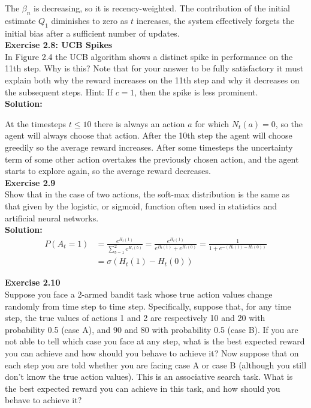 The $\beta_n$ is decreasing, so it is recency-weighted. The contribution of the initial estimate $Q_1$ diminishes to zero as $t$ increases, the system effectively forgets the initial bias after a sufficient number of updates.\\

\textbf{Exercise 2.8: UCB Spikes}\\
In Figure 2.4 the UCB algorithm shows a distinct spike
in performance on the 11th step. Why is this? Note that for your answer to be fully
satisfactory it must explain both why the reward increases on the 11th step and why it
decreases on the subsequent steps. Hint: If $c = 1$, then the spike is less prominent.\\

\textbf{Solution:}

At the timesteps $t \leq 10$ there is always an action $a$ for which $N_t(a) = 0$, so the agent will always choose that action. After the 10th step the agent will choose greedily so the average reward increases. After some timesteps the uncertainty term of some other action overtakes the previously chosen action, and the agent starts to explore again, so the average reward decreases.\\

\textbf{Exercise 2.9}\\
Show that in the case of two actions, the soft-max distribution is the same
as that given by the logistic, or sigmoid, function often used in statistics and artificial
neural networks.\\

\textbf{Solution:}\\

\begin{equation}
    \begin{aligned}
        P(A_t = 1) &= \frac{e^{H_t(1)}}{\sum_{b=1}^{2} e^{H_t(b)}} = \frac{e^{H_t(1)}}{e^{H_t(1)} + e^{H_t(0)}} = \frac{1}{1 + e^{-(H_t(1)-H_t(0))}} \\
        &= \sigma(H_t(1)-H_t(0))
    \end{aligned}
\end{equation}


\textbf{Exercise 2.10}\\
Suppose you face a 2-armed bandit task whose true action values change
randomly from time step to time step. Specifically, suppose that, for any time step,
the true values of actions 1 and 2 are respectively 10 and 20 with probability 0.5 (case
A), and 90 and 80 with probability 0.5 (case B). If you are not able to tell which case
you face at any step, what is the best expected reward you can achieve and how should
you behave to achieve it? Now suppose that on each step you are told whether you are
facing case A or case B (although you still don't know the true action values). This is an
associative search task. What is the best expected reward you can achieve in this task,
and how should you behave to achieve it?\\

